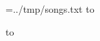 \documentclass{liederbuch}
\begin{document}
    
    \tableofcontents

    \newread\songs
    \openin\songs=../tmp/songs.txt
    \read\songs to \currentSong
    \loop\unless\ifeof\songs
    
    \read\songs to \currentSong
    \repeat
    \closein\songs
\end{document}
